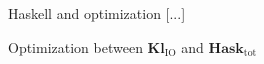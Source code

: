 \documentclass[11pt, a4paper]{article}
\begin{document}
\begin{section}{Haskell and optimization}
[...]

\begin{subsection}{Optimization between $\mathbf{Kl}_{\text{IO}}$ and $\mathbf{Hask}_{\text{tot}}$}
\end{subsection}

\end{section}




\end{document}
